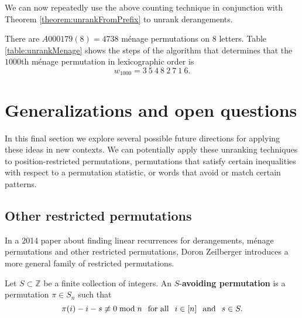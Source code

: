 We can now repeatedly use the above counting technique in conjunction with
Theorem \ref{theorem:unrankFromPrefix} to unrank derangements.

\begin{example}
  There are $A000179(8) = 4738$ m\'enage permutations on $8$ letters.
  Table \ref{table:unrankMenage} shows the steps of the algorithm that
  determines that the $1000$th m\'enage permutation in lexicographic order is
  \begin{equation}
    w_{1000} = 3 \ 5 \ 4 \ 8 \ 2 \ 7 \ 1 \ 6.
  \end{equation}
\end{example}



\section{Generalizations and open questions}

In this final section we explore several possible future directions for
applying these ideas in new contexts. We can potentially apply these unranking
techniques to position-restricted permutations, permutations that satisfy
certain inequalities with respect to a permutation statistic, or words that
avoid or match certain patterns.

%
\subsection{Other restricted permutations}
In a 2014 paper about finding linear recurrences for derangements, m\'enage
permutations and other restricted permutations, Doron Zeilberger
introduces a more general family of restricted permutations.
\begin{definition}
  Let $S \subset \mathbb Z$ be a finite collection of integers.
  An $S$-\textbf{avoiding permutation} is a permutation $\pi \in S_n$ such that
  \begin{equation}
    \pi(i) - i - s \not\equiv 0 \bmod n
    \hspace{0.25cm}\text{for all}\hspace{0.25cm}
    i \in [n]
    \hspace{0.25cm}\text{and}\hspace{0.25cm}
    s \in S.
  \end{equation}
\end{definition}

